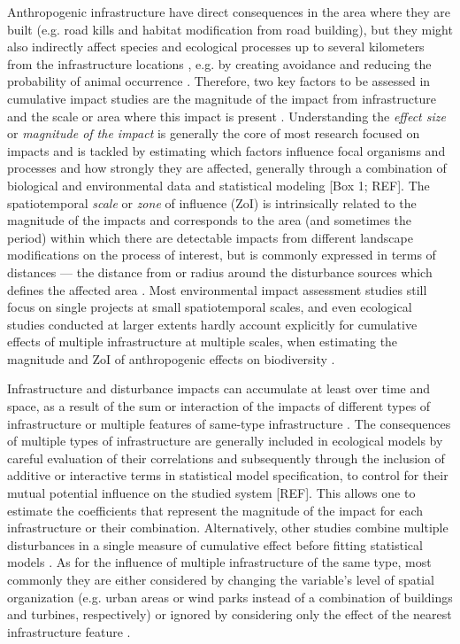 \documentclass[titlepage]{article}
\begin{document}
Anthropogenic infrastructure have direct consequences in the area where they are built (e.g. road kills and habitat modification from road building), but they might also indirectly affect species and ecological processes up to several kilometers from the infrastructure locations \citep{johnson_cumulative_2005,torres_assessing_2016}, e.g. by creating avoidance and reducing the probability of animal occurrence \citep{trombulak_review_2000,harris_grappling_2011}. Therefore, two key factors to be assessed in cumulative impact studies are the magnitude of the impact from infrastructure and the scale or area where this impact is present \citep[Box 1; ][]{naugle_unifying_2011}. Understanding the \textit{effect size} or \textit{magnitude of the impact} is generally the core of most research focused on impacts and is tackled by estimating which factors influence focal organisms and processes and how strongly they are affected, generally through a combination of biological and environmental data and statistical modeling [Box 1; REF]. The spatiotemporal \textit{scale} or \textit{zone} of influence (ZoI) is intrinsically related to the magnitude of the impacts and corresponds to the area (and sometimes the period) within which there are detectable impacts from different landscape modifications on the process of interest, but is commonly expressed in terms of distances --- the distance from or radius around the disturbance sources which defines the affected area \citep[Box 1; ][]{polfus_identifying_2011, boulanger_estimating_2012}. Most environmental impact assessment studies still focus on single projects at small spatiotemporal scales, and even ecological studies conducted at larger extents hardly account explicitly for cumulative effects of multiple infrastructure at multiple scales, when estimating the magnitude and ZoI of anthropogenic effects on biodiversity \citep{johnson_regulating_2011, mcgarigal_multi-scale_2016}. 

Infrastructure and disturbance impacts can accumulate at least over time and space, as a result of the sum or interaction of the impacts of different types of infrastructure or multiple features of same-type infrastructure \citep{wolfe_response_2000}. The consequences of multiple types of infrastructure are generally included in ecological models by careful evaluation of their correlations \citep{dormann_collinearity_2013} and subsequently through the inclusion of additive or interactive terms in statistical model specification, to control for their mutual potential influence on the studied system [REF]. This allows one to estimate the coefficients that represent the magnitude of the impact for each infrastructure or their combination. Alternatively, other studies combine multiple disturbances in a single measure of cumulative effect before fitting statistical models \citep{polfus_identifying_2011, venter_sixteen_2016, tucker_moving_2018}. As for the influence of multiple infrastructure of the same type, most commonly they are either considered by changing the variable's level of spatial organization (e.g. urban areas or wind parks instead of a combination of buildings and turbines, respectively) or ignored by considering only the effect of the nearest infrastructure feature \citep[e.g.][]{torres_assessing_2016}. 
\end{document}
